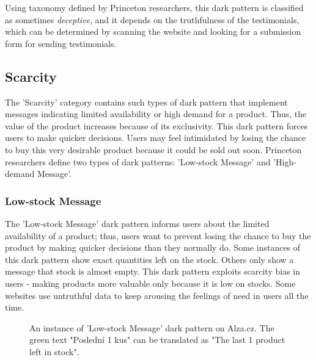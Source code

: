         Using taxonomy defined by Princeton researchers, this dark pattern is classified as sometimes \emph{deceptive}, and it depends on the truthfulness of the testimonials, which can be determined by scanning the website and looking for a submission form for sending testimonials.


    \subsection{Scarcity}
    The 'Scarcity' category contains such types of dark pattern that implement messages indicating limited availability or high demand for a product. Thus, the value of the product increases because of its exclusivity. This dark pattern forces users to make quicker decisions. Users may feel intimidated by losing the chance to buy this very desirable product because it could be sold out soon. Princeton researchers define two types of dark patterns: 'Low-stock Message' and 'High-demand Message'.
        \subsubsection{Low-stock Message}
        The 'Low-stock Message' dark pattern informs users about the limited availability of a product; thus, users want to prevent losing the chance to buy the product by making quicker decisions than they normally do. Some instances of this dark pattern show exact quantities left on the stock. Others only show a message that stock is almost empty. This dark pattern exploits scarcity bias in users - making products more valuable only because it is low on stocks. Some websites use untruthful data to keep arousing the feelings of need in users all the time.

        \begin{figure}[ht]
            \centering
            \caption{An instance of 'Low-stock Message' dark pattern on Alza.cz. The green text "Poslední 1 kus" can be translated as "The last 1 product left in stock".}
            \label{fig:low-stock-messages-alza1}
        \end{figure}

